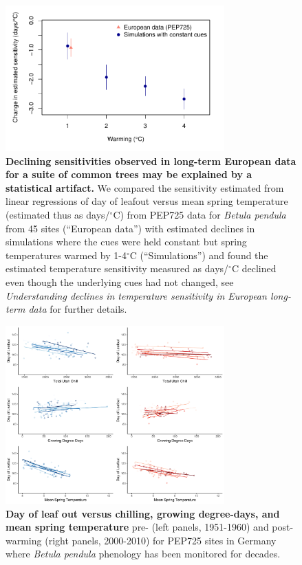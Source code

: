 \documentclass{article}
\begin{document}
\newpage
\begin{figure}[h!]
\centering
\noindent \includegraphics[width=0.75\textwidth]{..//..//analyses/bb_analysis/PEP_climate/figures/peprealandsims.pdf}
\caption{\textbf{Declining sensitivities observed in long-term European data for a suite of common trees may be explained by a statistical artifact.} We compared the sensitivity estimated from linear regressions of day of leafout versus mean spring temperature (estimated thus as days/$^{\circ}$C) from PEP725 data for \emph{Betula pendula} from 45 sites (``European data'') with estimated declines in simulations where the cues were held constant but spring temperatures warmed by 1-4$^{\circ}$C (``Simulations'') and found the estimated temperature sensitivity measured as days/$^{\circ}$C declined even though the underlying cues had not changed, see \emph{Understanding declines in temperature sensitivity in European long-term data} for further details.}
\label{fig:pepsims}
\end{figure}

\newpage
\begin{figure}[h!]
\centering
\noindent \includegraphics[width=0.75\textwidth]{..//..//analyses/bb_analysis/PEP_climate/figures/betpen_multruns_utahgddmat.pdf}
\caption{\textbf{Day of leaf out versus chilling, growing degree-days, and mean spring temperature} pre- (left panels, 1951-1960) and post-warming (right panels, 2000-2010) for PEP725 sites in Germany where \emph{Betula pendula} phenology has been monitored for decades.}
\label{fig:pep}
\end{figure}
\end{document}
